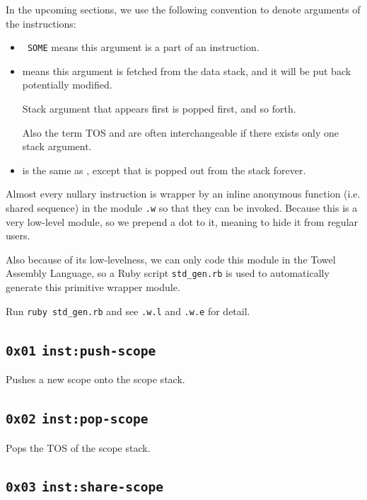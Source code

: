 \documentclass{report}
\newcommand{\mtilde}[1]{\textasciitilde}
\newcommand{\marg}[1]{\texttt{\mtilde ~#1}}
\newcommand{\inst}[1] {\texttt{inst:#1}}
\begin{document}
\begin{mdframed}[style=hint]
  In the upcoming sections, we use the following convention to denote arguments of the instructions:

  \begin{itemize}
  \item \marg{SOME} means this argument is a part of an instruction.
  \item {} means this argument is fetched from the data stack, and it will be put back potentially modified.

Stack argument that appears first is popped first, and so forth.

Also the term TOS and  are often interchangeable if there exists only one stack argument.
  \item {} is the same as , except that  is popped out from the stack forever.
  \end{itemize}
\end{mdframed}

\begin{mdframed}[style=hint]
Almost every nullary instruction is wrapper by an inline anonymous function (i.e. shared sequence) in the module \texttt{.w} so that they can be invoked. Because this is a very low-level module, so we prepend a dot to it, meaning to hide it from regular users.

Also because of its low-levelness, we can only code this module in the Towel Assembly Language, so a Ruby script \texttt{std\_gen.rb} is used to automatically generate this primitive wrapper module.

Run \texttt{ruby std\_gen.rb} and see \texttt{.w.l} and \texttt{.w.e} for detail.
\end{mdframed}

\subsection{\texttt{0x01} \inst{push-scope}}

Pushes a new scope onto the scope stack.

\subsection{\texttt{0x02} \inst{pop-scope}}

Pops the TOS of the scope stack.

\subsection{\texttt{0x03} \inst{share-scope}}
\end{document}
